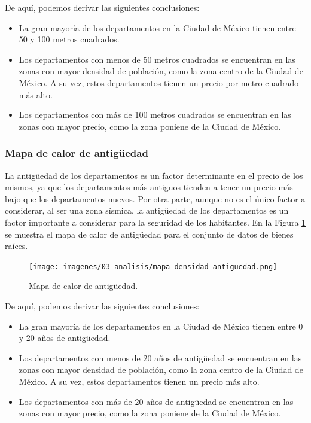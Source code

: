 De aquí, podemos derivar las siguientes conclusiones:

\begin{itemize}
  \item La gran mayoría de los departamentos en la Ciudad de México tienen entre
  50 y 100 metros cuadrados.
  \item Los departamentos con menos de 50 metros cuadrados se encuentran en las
  zonas con mayor densidad de población, como la zona centro de la Ciudad de
  México. A su vez, estos departamentos tienen un precio por metro cuadrado más
  alto.
  \item Los departamentos con más de 100 metros cuadrados se encuentran en las
  zonas con mayor precio, como la zona poniene de la Ciudad de México.
\end{itemize}

\subsubsection{Mapa de calor de antigüedad}

La antigüedad de los departamentos es un factor determinante en el precio de los
mismos, ya que los departamentos más antiguos tienden a tener un precio más bajo
que los departamentos nuevos. Por otra parte, aunque no es el único factor a
considerar, al ser una zona sísmica, la antigüedad de los departamentos es un
factor importante a considerar para la seguridad de los habitantes. En la Figura
\ref{fig:mapa_calor_antiguedad} se muestra el mapa de calor de antigüedad para
el conjunto de datos de bienes raíces.

\begin{figure}[H]
  \centering
  \texttt{[image: imagenes/03-analisis/mapa-densidad-antiguedad.png]}
  \caption{Mapa de calor de antigüedad.}
  \label{fig:mapa_calor_antiguedad}
\end{figure}

De aquí, podemos derivar las siguientes conclusiones:

\begin{itemize}
  \item La gran mayoría de los departamentos en la Ciudad de México tienen entre
  0 y 20 años de antigüedad.
  \item Los departamentos con menos de 20 años de antigüedad se encuentran en las
  zonas con mayor densidad de población, como la zona centro de la Ciudad de
  México. A su vez, estos departamentos tienen un precio más alto.
  \item Los departamentos con más de 20 años de antigüedad se encuentran en las
  zonas con mayor precio, como la zona poniene de la Ciudad de México.
\end{itemize}

